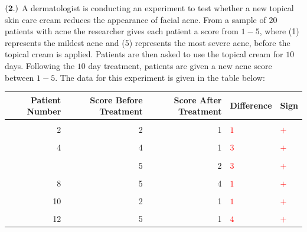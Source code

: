 \documentclass[
]{article}
\begin{document}
\(\bf (2.)\) A dermatologist is conducting an experiment to test whether
a new topical skin care cream reduces the appearance of facial acne.
From a sample of \(20\) patients with acne the researcher gives each
patient a score from \(1-5\), where (1) represents the mildest acne and
(5) represents the most severe acne, before the topical cream is
applied. Patients are then asked to use the topical cream for \(10\)
days. Following the \(10\) day treatment, patients are given a new acne
score between \(1-5\). The data for this experiment is given in the
table below:

\begin{table}[H]
\centering\centering
\begin{tabular}{rrrll}
\toprule
Patient Number & Score Before Treatment & Score After Treatment & Difference & Sign\\
\midrule
\cellcolor{gray!10}{1} & \cellcolor{gray!10}{3} & \cellcolor{gray!10}{2} & \cellcolor{gray!10}{\textcolor{red}{$1$}} & \cellcolor{gray!10}{\textcolor{red}{$+$}}\\
2 & 2 & 1 & \textcolor{red}{$1$} & \textcolor{red}{$+$}\\
\cellcolor{gray!10}{3} & \cellcolor{gray!10}{4} & \cellcolor{gray!10}{1} & \cellcolor{gray!10}{\textcolor{red}{$3$}} & \cellcolor{gray!10}{\textcolor{red}{$+$}}\\
4 & 4 & 1 & \textcolor{red}{$3$} & \textcolor{red}{$+$}\\
\cellcolor{gray!10}{5} & \cellcolor{gray!10}{4} & \cellcolor{gray!10}{1} & \cellcolor{gray!10}{\textcolor{red}{$3$}} & \cellcolor{gray!10}{\textcolor{red}{$+$}}\\
\addlinespace
6 & 5 & 2 & \textcolor{red}{$3$} & \textcolor{red}{$+$}\\
\cellcolor{gray!10}{7} & \cellcolor{gray!10}{1} & \cellcolor{gray!10}{1} & \cellcolor{gray!10}{\textcolor{red}{$0$}} & \cellcolor{gray!10}{}\\
8 & 5 & 4 & \textcolor{red}{$1$} & \textcolor{red}{$+$}\\
\cellcolor{gray!10}{9} & \cellcolor{gray!10}{5} & \cellcolor{gray!10}{1} & \cellcolor{gray!10}{\textcolor{red}{$4$}} & \cellcolor{gray!10}{\textcolor{red}{$+$}}\\
10 & 2 & 1 & \textcolor{red}{$1$} & \textcolor{red}{$+$}\\
\addlinespace
\cellcolor{gray!10}{11} & \cellcolor{gray!10}{2} & \cellcolor{gray!10}{2} & \cellcolor{gray!10}{\textcolor{red}{$0$}} & \cellcolor{gray!10}{}\\
12 & 5 & 1 & \textcolor{red}{$4$} & \textcolor{red}{$+$}\\

\end{tabular}
\end{table}
\end{document}
